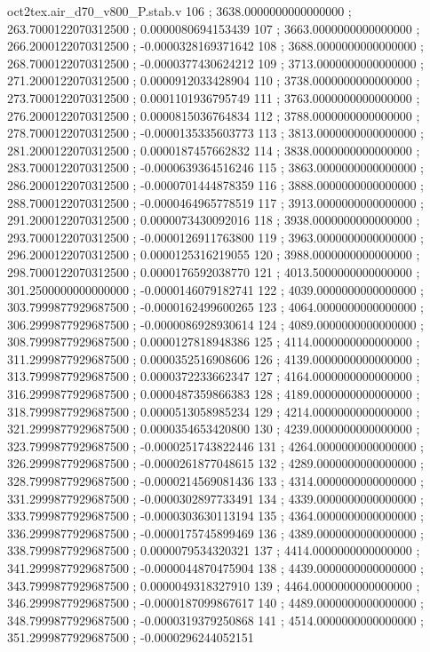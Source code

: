 \begin{filecontents}[overwrite]{oct2tex.air_d70_v800_P.stab.v}
106 ; 3638.0000000000000000 ; 263.7000122070312500 ; 0.0000080694153439
107 ; 3663.0000000000000000 ; 266.2000122070312500 ; -0.0000328169371642
108 ; 3688.0000000000000000 ; 268.7000122070312500 ; -0.0000377430624212
109 ; 3713.0000000000000000 ; 271.2000122070312500 ; 0.0000912033428904
110 ; 3738.0000000000000000 ; 273.7000122070312500 ; 0.0001101936795749
111 ; 3763.0000000000000000 ; 276.2000122070312500 ; 0.0000815036764834
112 ; 3788.0000000000000000 ; 278.7000122070312500 ; -0.0000135335603773
113 ; 3813.0000000000000000 ; 281.2000122070312500 ; 0.0000187457662832
114 ; 3838.0000000000000000 ; 283.7000122070312500 ; -0.0000639364516246
115 ; 3863.0000000000000000 ; 286.2000122070312500 ; -0.0000701444878359
116 ; 3888.0000000000000000 ; 288.7000122070312500 ; -0.0000464965778519
117 ; 3913.0000000000000000 ; 291.2000122070312500 ; 0.0000073430092016
118 ; 3938.0000000000000000 ; 293.7000122070312500 ; -0.0000126911763800
119 ; 3963.0000000000000000 ; 296.2000122070312500 ; 0.0000125316219055
120 ; 3988.0000000000000000 ; 298.7000122070312500 ; 0.0000176592038770
121 ; 4013.5000000000000000 ; 301.2500000000000000 ; -0.0000146079182741
122 ; 4039.0000000000000000 ; 303.7999877929687500 ; -0.0000162499600265
123 ; 4064.0000000000000000 ; 306.2999877929687500 ; -0.0000086928930614
124 ; 4089.0000000000000000 ; 308.7999877929687500 ; 0.0000127818948386
125 ; 4114.0000000000000000 ; 311.2999877929687500 ; 0.0000352516908606
126 ; 4139.0000000000000000 ; 313.7999877929687500 ; 0.0000372233662347
127 ; 4164.0000000000000000 ; 316.2999877929687500 ; 0.0000487359866383
128 ; 4189.0000000000000000 ; 318.7999877929687500 ; 0.0000513058985234
129 ; 4214.0000000000000000 ; 321.2999877929687500 ; 0.0000354653420800
130 ; 4239.0000000000000000 ; 323.7999877929687500 ; -0.0000251743822446
131 ; 4264.0000000000000000 ; 326.2999877929687500 ; -0.0000261877048615
132 ; 4289.0000000000000000 ; 328.7999877929687500 ; -0.0000214569081436
133 ; 4314.0000000000000000 ; 331.2999877929687500 ; -0.0000302897733491
134 ; 4339.0000000000000000 ; 333.7999877929687500 ; -0.0000303630113194
135 ; 4364.0000000000000000 ; 336.2999877929687500 ; -0.0000175745899469
136 ; 4389.0000000000000000 ; 338.7999877929687500 ; 0.0000079534320321
137 ; 4414.0000000000000000 ; 341.2999877929687500 ; -0.0000044870475904
138 ; 4439.0000000000000000 ; 343.7999877929687500 ; 0.0000049318327910
139 ; 4464.0000000000000000 ; 346.2999877929687500 ; -0.0000187099867617
140 ; 4489.0000000000000000 ; 348.7999877929687500 ; -0.0000319379250868
141 ; 4514.0000000000000000 ; 351.2999877929687500 ; -0.0000296244052151

\end{filecontents}
